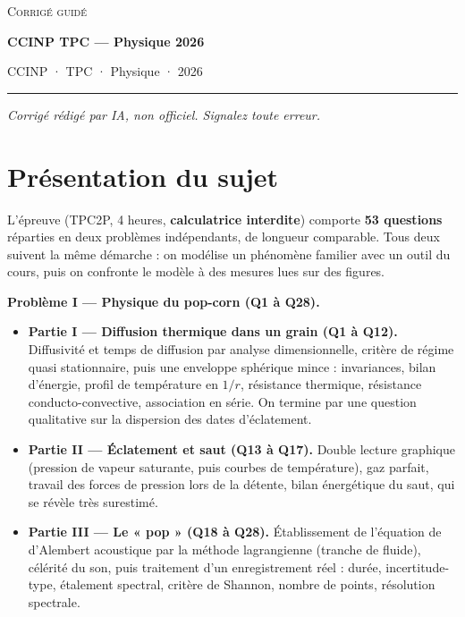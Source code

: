 \documentclass[11pt,a4paper]{article}
\providecommand{\tightlist}{\setlength{\itemsep}{0pt}\setlength{\parskip}{0pt}}
\begin{document}
\thispagestyle{plain}
\begin{center}
  {\small\scshape Corrigé guidé}\par\smallskip
  {\LARGE\bfseries CCINP TPC — Physique 2026\par}\medskip
  {\large CCINP · TPC · Physique · 2026\par}
\end{center}
\vspace{2pt}\hrule\vspace{8pt}

\emph{Corrigé rédigé par IA, non officiel. Signalez toute erreur.}

\hypertarget{pruxe9sentation-du-sujet}{%
\section{Présentation du sujet}\label{pruxe9sentation-du-sujet}}

L'épreuve (TPC2P, 4 heures, \textbf{calculatrice interdite}) comporte \textbf{53 questions} réparties en deux problèmes indépendants, de longueur comparable. Tous deux suivent la même démarche : on modélise un phénomène familier avec un outil du cours, puis on confronte le modèle à des mesures lues sur des figures.

\textbf{Problème I --- Physique du pop-corn (Q1 à Q28).}

\begin{itemize}
\tightlist
\item
  \textbf{Partie I --- Diffusion thermique dans un grain (Q1 à Q12).} Diffusivité et temps de diffusion par analyse dimensionnelle, critère de régime quasi stationnaire, puis une enveloppe sphérique mince : invariances, bilan d'énergie, profil de température en \(1/r\), résistance thermique, résistance conducto-convective, association en série. On termine par une question qualitative sur la dispersion des dates d'éclatement.
\item
  \textbf{Partie II --- Éclatement et saut (Q13 à Q17).} Double lecture graphique (pression de vapeur saturante, puis courbes de température), gaz parfait, travail des forces de pression lors de la détente, bilan énergétique du saut, qui se révèle très surestimé.
\item
  \textbf{Partie III --- Le « pop » (Q18 à Q28).} Établissement de l'équation de d'Alembert acoustique par la méthode lagrangienne (tranche de fluide), célérité du son, puis traitement d'un enregistrement réel : durée, incertitude-type, étalement spectral, critère de Shannon, nombre de points, résolution spectrale.
\end{itemize}
\end{document}
